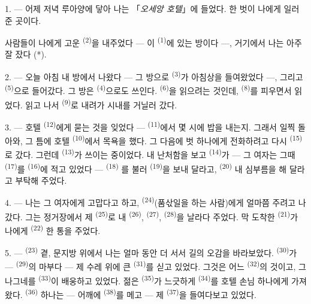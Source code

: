 1. --- 어제 저녁 루아양에 닿아 나는 「\textit{오세앙 호텔}」에 들었다. 한 벗이 나에게
일러 준 곳이다.

사람들이 나에게 고운  \textsuperscript{(2)}을 내주었다 — 이 
\textsuperscript{(1)}에 있는 방이다 —, 거기에서 나는 아주 잘 잤다 (*).

2. --- 오늘 아침 내 방에서 나왔다 — 그 방으로  \textsuperscript{(3)}가
아침상을 들여왔었다 —, 그리고  \textsuperscript{(5)}으로 들어갔다.
그 방은  \textsuperscript{(4)}으로도 쓰인다. 
\textsuperscript{(6)}을 읽으려는 것인데,  \textsuperscript{(8)}를 피우면서
읽었다. 읽고 나서  \textsuperscript{(9)}로 내려가 시내를 거닐러 갔다.

3. --- 호텔  \textsuperscript{(12)}에게 묻는 것을 잊었다 —
 \textsuperscript{(11)}에서 몇 시에 밥을 내는지. 그래서 일찍 돌아와, 그
틈에 호텔  \textsuperscript{(10)}에서 목욕을 했다. 그 다음에 벗 하나에게
전화하려고 다시  \textsuperscript{(15)}로 갔다. 그런데 
\textsuperscript{(13)}가 쓰이는 중이었다. 내 난처함을 보고 
\textsuperscript{(14)}가 — 그 여자는 그때  \textsuperscript{(17)}를
 \textsuperscript{(16)}에 적고 있었다 —  \textsuperscript{(18)}
를 불러  \textsuperscript{(19)}을 보내 달라고, 
\textsuperscript{(20)} 내 심부름을 해 달라고 부탁해 주었다.

4. --- 나는 그 여자에게 고맙다고 하고,  \textsuperscript{(24)}(품삯일을 하는
사람)에게 얼마쯤 주려고 나갔다. 그는 정거장에서 제  \textsuperscript{(25)}로
내  \textsuperscript{(26)},  \textsuperscript{(27)},
 \textsuperscript{(28)}을 날라다 주었다. 막 도착한 
\textsuperscript{(21)}가 나에게  \textsuperscript{(22)} 한 통을 주었다.

5. ---  \textsuperscript{(23)} 곁, 문지방 위에서 나는 얼마 동안 더 서서
길의 오감을 바라보았다.  \textsuperscript{(30)}가 — 
\textsuperscript{(29)}의 마부다 — 제 수레 위에 큰  \textsuperscript{(31)}를
싣고 있었다. 그것은 어느  \textsuperscript{(32)}의 것이고, 그 나그네를
 \textsuperscript{(33)}이 배웅하고 있었다. 젊은 
\textsuperscript{(35)}가 느긋하게  \textsuperscript{(34)}를 호텔 손님 하나에게
가져왔다.  \textsuperscript{(36)} 하나는 — 어깨에 
\textsuperscript{(38)}를 메고 — 제  \textsuperscript{(37)}을 들여다보고
있었다.

